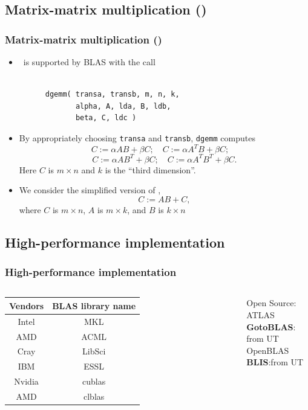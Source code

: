 \documentclass[xcolor=pdflatex,dvipsnames,table]{beamer}
\begin{document}
\subsection{Matrix-matrix multiplication (\Gemm)}
\begin{frame}[fragile]
\frametitle{Matrix-matrix multiplication (\Gemm)}
\begin{itemize}
\item \Gemm\ is supported by BLAS with the call
\begin{verbatim}

      dgemm( transa, transb, m, n, k,
             alpha, A, lda, B, ldb,
             beta, C, ldc )

\end{verbatim}
\item By appropriately choosing {\tt transa} and {\tt transb},
{\tt dgemm} computes
\[
C := \alpha A B + \beta C; \quad
C := \alpha A^T B + \beta C; \quad
\]
\[
C := \alpha A B^T + \beta C; \quad
C := \alpha A^T B^T + \beta C.
\]
Here $ C $ is $ m \times n $ and $ k $ is the ``third dimension''.

\item We consider the simplified version of \Gemm,
\[
C := A B + C,
\]
where $ C $ is $ m \times n $,
$ A $ is $ m \times k $, and $ B $ is $ k \times n $
\end{itemize}

\end{frame}

\subsection{High-performance implementation}
\begin{frame}[fragile]
\frametitle{High-performance implementation}

  \begin{columns}
\centering
{
{\footnotesize
  \begin{tabular}{c|c}
  \hline
Vendors & BLAS library name \\
  \hline
Intel & MKL \\
AMD   & ACML \\
Cray  & LibSci \\
IBM   & ESSL \\
\hline
Nvidia & cublas \\
AMD    & clblas \\
\hline
\end{tabular}
}
}
Open Source:\\
ATLAS\\
\textbf{GotoBLAS}: from UT\\
OpenBLAS\\
\textbf{BLIS}:from UT
\end{columns}

\end{frame}
\end{document}
